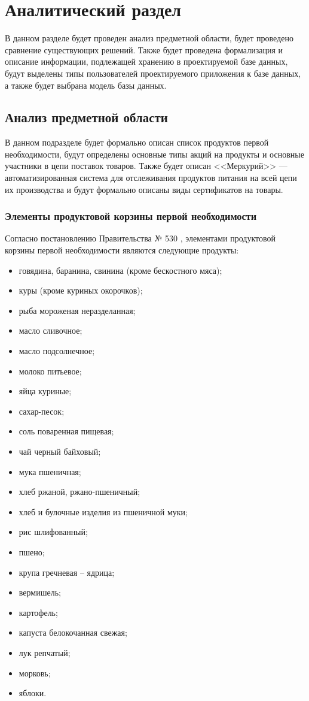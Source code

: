 \chapter{Аналитический раздел}

В данном разделе будет проведен анализ предметной области, будет проведено сравнение существующих решений. 
Также будет проведена формализация и описание информации, подлежащей хранению в проектируемой базе данных, будут выделены типы пользователей проектируемого приложения к базе данных, а также будет выбрана модель базы данных.

\section{Анализ предметной области}

В данном подразделе будет формально описан список продуктов первой необходимости, будут определены основные типы акций на продукты и основные участники в цепи поставок товаров. Также будет описан <<Меркурий>> --- автоматизированная система для отслеживания продуктов питания на всей цепи их производства и будут формально описаны виды сертификатов на товары.

\subsection*{Элементы продуктовой корзины первой необходимости}

Согласно постановлению Правительства № 530 \cite{info_essential_goods2}, элементами продуктовой корзины первой необходимости являются следующие продукты:

\begin{itemize}[label=--]
	\item говядина, баранина, свинина (кроме бескостного мяса);
	\item куры (кроме куриных окорочков);
	\item рыба мороженая неразделанная;
	\item масло сливочное;
	\item масло подсолнечное;
	\item молоко питьевое;
	\item яйца куриные;
	\item сахар-песок;
	\item соль поваренная пищевая;
	\item чай черный байховый;
	\item мука пшеничная;
	\item хлеб ржаной, ржано-пшеничный;
	\item хлеб и булочные изделия из пшеничной муки;
	\item рис шлифованный;
	\item пшено;
	\item крупа гречневая -- ядрица;
	\item вермишель;
	\item картофель;
	\item капуста белокочанная свежая;
	\item лук репчатый;
	\item морковь;
	\item яблоки.
\end{itemize}

